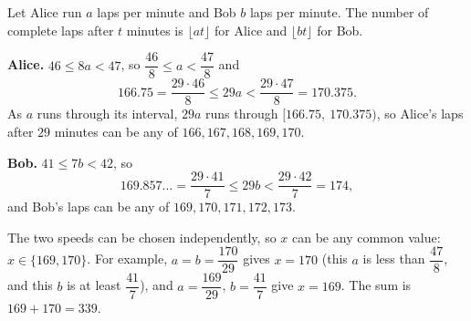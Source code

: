 Let Alice run $a$ laps per minute and Bob $b$ laps per minute. The number of complete laps after $t$ minutes is $\lfloor at\rfloor$ for Alice and $\lfloor bt\rfloor$ for Bob.

\textbf{Alice.} $46\le8a<47$, so $\dfrac{46}{8}\le a<\dfrac{47}{8}$ and
\[166.75=\dfrac{29\cdot46}{8}\le29a<\dfrac{29\cdot47}{8}=170.375 .\]
As $a$ runs through its interval, $29a$ runs through $[166.75,\ 170.375)$, so Alice's laps after $29$ minutes can be any of $166,167,168,169,170$.

\textbf{Bob.} $41\le7b<42$, so
\[169.857\ldots=\dfrac{29\cdot41}{7}\le29b<\dfrac{29\cdot42}{7}=174,\]
and Bob's laps can be any of $169,170,171,172,173$.

The two speeds can be chosen independently, so $x$ can be any common value: $x\in\{169,170\}$. For example, $a=b=\dfrac{170}{29}$ gives $x=170$ (this $a$ is less than $\dfrac{47}{8}$, and this $b$ is at least $\dfrac{41}{7}$), and $a=\dfrac{169}{29}$, $b=\dfrac{41}{7}$ give $x=169$. The sum is $169+170=\boxed{339}$.
